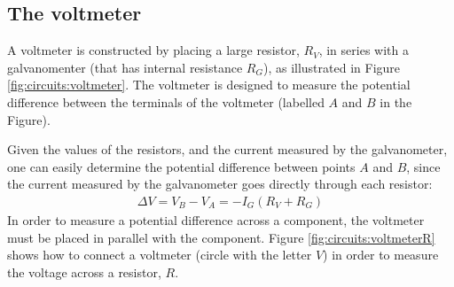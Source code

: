 
\subsection{The voltmeter}
A voltmeter is constructed by placing a large resistor, $R_V$, in series with a galvanomenter (that has internal resistance $R_G$), as illustrated in Figure \ref{fig:circuits:voltmeter}. The voltmeter is designed to measure the potential difference between the terminals of the voltmeter (labelled $A$ and $B$ in the Figure).


Given the values of the resistors, and the current measured by the galvanometer, one can easily determine the potential difference between points $A$ and $B$, since the current measured by the galvanometer goes directly through each resistor:
\begin{align*}
\Delta V = V_B-V_A=-I_G(R_V+R_G)
\end{align*}
In order to measure a potential difference across a component, the voltmeter must be placed in parallel with the component. Figure \ref{fig:circuits:voltmeterR} shows how to connect a voltmeter (circle with the letter $V$) in order to measure the voltage across a resistor, $R$.


